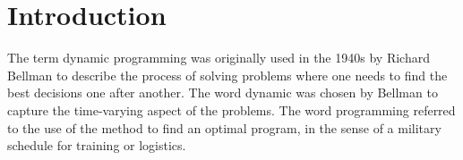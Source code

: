 \section{Introduction}

The term dynamic programming was originally used in the 1940s by Richard Bellman to describe the process of solving problems where one needs to find the best decisions one after another.
The word dynamic was chosen by Bellman to capture the time-varying aspect of the problems.
The word programming referred to the use of the method to find an optimal program, in the sense of a military schedule for training or logistics. 


